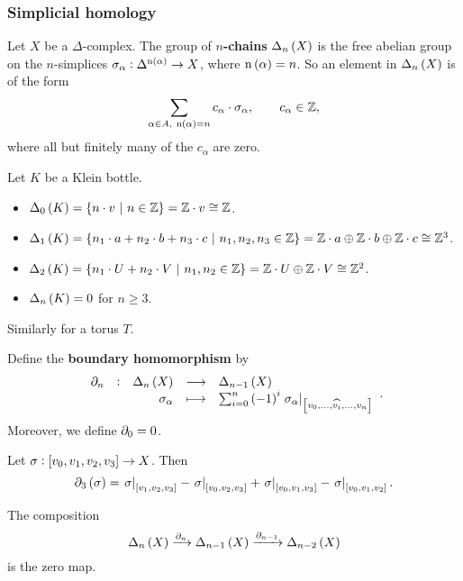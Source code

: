 \subsubsection{Simplicial homology}

Let $ X $ be a $ \Delta $-complex. The group of \textbf{$ n $-chains} $ \Delta_n\br{X} $ is the free abelian group on the $ n $-simplices $ \sigma_\alpha : \Delta^{\n\br{\alpha}} \to X $, where $ \n\br{\alpha} = n $. So an element in $ \Delta_n\br{X} $ is of the form
$$ \sum_{\alpha \in A, \ \n\br{\alpha} = n} c_\alpha \cdot \sigma_\alpha, \qquad c_\alpha \in \ZZ, $$
where all but finitely many of the $ c_\alpha $ are zero.

\begin{example*}
Let $ K $ be a Klein bottle.
\begin{itemize}
\item $ \Delta_0\br{K} = \cbr{n \cdot v \st n \in \ZZ} = \ZZ \cdot v \cong \ZZ $.
\item $ \Delta_1\br{K} = \cbr{n_1 \cdot a + n_2 \cdot b + n_3 \cdot c \st n_1, n_2, n_3 \in \ZZ} = \ZZ \cdot a \oplus \ZZ \cdot b \oplus \ZZ \cdot c \cong \ZZ^3 $.
\item $ \Delta_2\br{K} = \cbr{n_1 \cdot U + n_2 \cdot V \st n_1, n_2 \in \ZZ} = \ZZ \cdot U \oplus \ZZ \cdot V \cong \ZZ^2 $.
\item $ \Delta_n\br{K} = 0 $ for $ n \ge 3 $.
\end{itemize}
Similarly for a torus $ T $.
\end{example*}


Define the \textbf{boundary homomorphism} by
$$ \function[\da_n]{\Delta_n\br{X}}{\Delta_{n - 1}\br{X}}{\sigma_\alpha}{\sum_{i = 0}^n \br{-1}^i\eval{\sigma_\alpha}_{\sbr{v_0, \dots, \widehat{v_i}, \dots, v_n}}}. $$
Moreover, we define $ \partial_0 = 0 $.

\begin{example*}
Let $ \sigma : \sbr{v_0, v_1, v_2, v_3} \to X $. Then
$$ \da_3\br{\sigma} = \eval{\sigma}_{\sbr{v_1, v_2, v_3}} - \eval{\sigma}_{\sbr{v_0, v_2, v_3}} + \eval{\sigma}_{\sbr{v_0, v_1, v_3}} - \eval{\sigma}_{\sbr{v_0, v_1, v_2}}. $$
\end{example*}

\begin{lemma}
\label{lem:2.1}
The composition
$$ \Delta_n\br{X} \xrightarrow{\da_n} \Delta_{n - 1}\br{X} \xrightarrow{\da_{n - 1}} \Delta_{n - 2}\br{X} $$
is the zero map.
\end{lemma}

